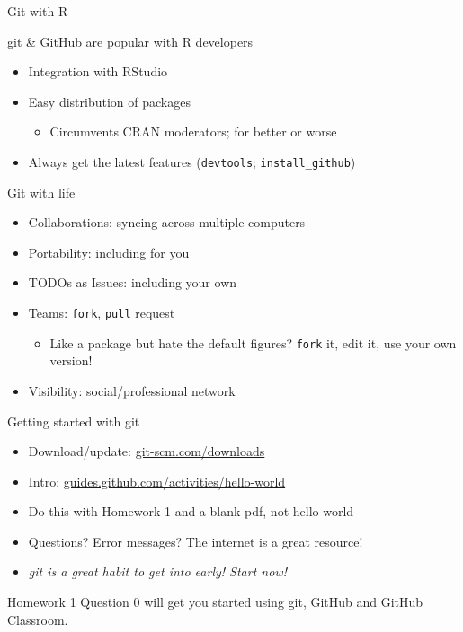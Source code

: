 \documentclass[ignorenonframetext,]{beamer}
\providecommand{\tightlist}{%
  \setlength{\itemsep}{0pt}\setlength{\parskip}{0pt}}
\begin{document}
\begin{frame}[fragile]{Git with R}
\protect\hypertarget{git-with-r}{}

git \& GitHub are popular with R developers

\begin{itemize}
\tightlist
\item
  Integration with RStudio
\item
  Easy distribution of packages

  \begin{itemize}
  \tightlist
  \item
    Circumvents CRAN moderators; for better or worse
  \end{itemize}
\item
  Always get the latest features (\texttt{devtools};
  \texttt{install\_github})
\end{itemize}

\end{frame}

\begin{frame}[fragile]{Git with life}
\protect\hypertarget{git-with-life}{}

\begin{itemize}
\tightlist
\item
  Collaborations: syncing across multiple computers
\item
  Portability: including for you
\item
  TODOs as Issues: including your own
\item
  Teams: \texttt{fork}, \texttt{pull} request

  \begin{itemize}
  \tightlist
  \item
    Like a package but hate the default figures? \texttt{fork} it, edit
    it, use your own version!
  \end{itemize}
\item
  Visibility: social/professional network
\end{itemize}

\end{frame}

\begin{frame}{Getting started with git}
\protect\hypertarget{getting-started-with-git}{}

\begin{itemize}
\tightlist
\item
  Download/update: \url{git-scm.com/downloads}
\item
  Intro: \url{guides.github.com/activities/hello-world}
\item
  Do this with Homework 1 and a blank pdf, not hello-world
\item
  Questions? Error messages? The internet is a great resource!
\item
  \emph{git is a great habit to get into early! Start now!}
\end{itemize}

Homework 1 Question 0 will get you started using git, GitHub and GitHub
Classroom.

\end{frame}
\end{document}
